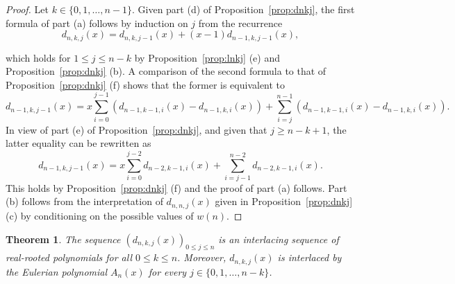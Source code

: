 \documentclass[11pt]{amsart}
\newtheorem{theorem}{Theorem}[section]
\begin{document}
\begin{proof}
Let $k \in \{0, 1,\dots,n-1\}$. Given part (d) of 
Proposition~\ref{prop:dnkj}, the first formula of 
part (a) follows by induction on $j$ from the 
recurrence 
%
\[ d_{n,k,j}(x) = d_{n,k,j-1}(x) + (x-1) 
   d_{n-1,k,j-1}(x), \]

\medskip
\noindent
which holds for $1 \le j \le n-k$ by 
Proposition~\ref{prop:lnkj} (e) and 
Proposition~\ref{prop:dnkj} (b). A comparison of 
the second formula to that of 
Proposition~\ref{prop:dnkj} (f) shows that the 
former is equivalent to 
%
\[ d_{n-1,k,j-1}(x) = x \sum_{i=0}^{j-1} 
   \left( d_{n-1,k-1,i}(x) - d_{n-1,k,i}(x) 
	            \right) + \sum_{i=j}^{n-1}
	 \left( d_{n-1,k-1,i}(x) - d_{n-1,k,i}(x) 
	            \right). \]
%
In view of part (e) of Proposition~\ref{prop:dnkj},
and given that $j \ge n-k+1$, the latter equality 
can be rewritten as 
%
\[ d_{n-1,k,j-1}(x) = x \sum_{i=0}^{j-2} 
   d_{n-2,k-1,i}(x) + \sum_{i=j-1}^{n-2} 
	                             d_{n-2,k-1,i}(x). \]
%
This holds by Proposition~\ref{prop:dnkj} (f) and
the proof of part (a) follows. Part (b) follows 
from the interpretation of $d_{n,n,j}(x)$ given 
in Proposition~\ref{prop:dnkj} (c) by conditioning 
on the possible values of $w(n)$. 
\end{proof}

%
\begin{theorem} \label{thm:dnkj} 
The sequence $(d_{n,k,j}(x))_{0 \le j \le n}$ is 
an interlacing sequence of real-rooted polynomials
for all $0 \le k \le n$. Moreover, $d_{n,k,j}(x)$ 
is interlaced by the Eulerian polynomial $A_n(x)$
for every $j \in \{0, 1,\dots,n-k\}$. 
\end{theorem}
\end{document}
